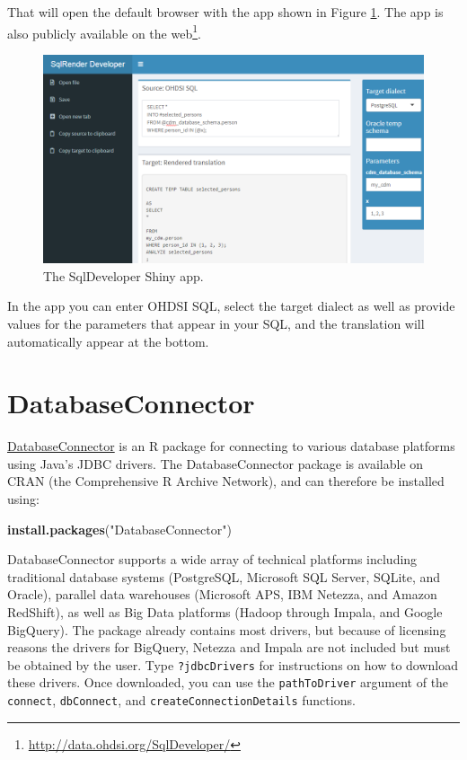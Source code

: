 \documentclass[11pt]{book}
\newenvironment{Shaded}{\begin{snugshade}}{\end{snugshade}}
\newcommand{\KeywordTok}[1]{\textcolor[rgb]{0.13,0.29,0.53}{\textbf{#1}}}
\newcommand{\NormalTok}[1]{#1}
\newcommand{\StringTok}[1]{\textcolor[rgb]{0.31,0.60,0.02}{#1}}
\let\rmarkdownfootnote\footnote%
\def\footnote{\protect\rmarkdownfootnote}
\theoremstyle{definition}
\theoremstyle{definition}
\theoremstyle{definition}
\theoremstyle{remark}
\begin{document}
That will open the default browser with the app shown in Figure \ref{fig:sqlDeveloper}. The app is also publicly available on the web\footnote{\url{http://data.ohdsi.org/SqlDeveloper/}}.

\begin{figure}

{\centering \includegraphics[width=1\linewidth]{images/SqlAndR/sqlDeveloper} 

}

\caption{The SqlDeveloper Shiny app.}\label{fig:sqlDeveloper}
\end{figure}

In the app you can enter OHDSI SQL, select the target dialect as well as provide values for the parameters that appear in your SQL, and the translation will automatically appear at the bottom.

\hypertarget{DatabaseConnector}{%
\section{DatabaseConnector}\label{DatabaseConnector}}

\href{https://ohdsi.github.io/DatabaseConnector/}{DatabaseConnector} is an R package for connecting to various database platforms using Java's JDBC drivers. The DatabaseConnector package is available on CRAN (the Comprehensive R Archive Network), and can therefore be installed using:

\begin{Shaded}
\begin{Highlighting}[]
\KeywordTok{install.packages}\NormalTok{(}\StringTok{"DatabaseConnector"}\NormalTok{)}
\end{Highlighting}
\end{Shaded}

DatabaseConnector supports a wide array of technical platforms including traditional database systems (PostgreSQL, Microsoft SQL Server, SQLite, and Oracle), parallel data warehouses (Microsoft APS, IBM Netezza, and Amazon RedShift), as well as Big Data platforms (Hadoop through Impala, and Google BigQuery). The package already contains most drivers, but because of licensing reasons the drivers for BigQuery, Netezza and Impala are not included but must be obtained by the user. Type \texttt{?jdbcDrivers} for instructions on how to download these drivers. Once downloaded, you can use the \texttt{pathToDriver} argument of the \texttt{connect}, \texttt{dbConnect}, and \texttt{createConnectionDetails} functions.
\end{document}
